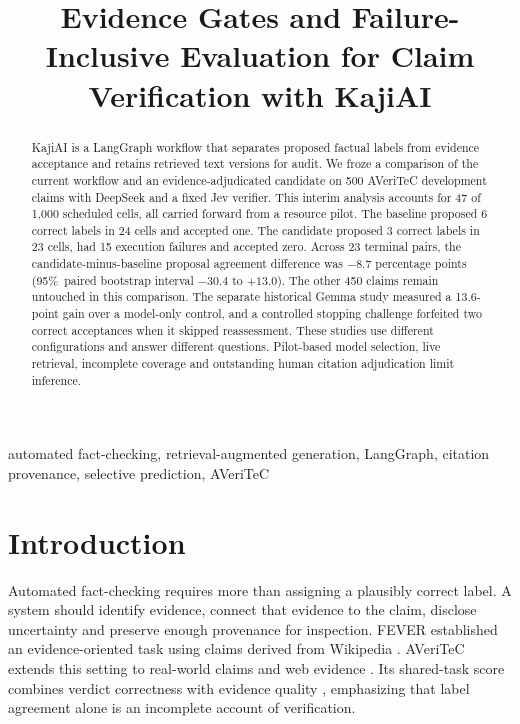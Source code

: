 \documentclass[conference]{IEEEtran}
\newcommand{\pct}{\%}
\begin{document}
\title{Evidence Gates and Failure-Inclusive Evaluation for Claim Verification with KajiAI}

\author{}
\maketitle

\begin{abstract}
KajiAI is a LangGraph workflow that separates proposed factual labels from evidence acceptance and retains retrieved text versions for audit. We froze a comparison of the current workflow and an evidence-adjudicated candidate on 500 AVeriTeC development claims with DeepSeek and a fixed Jev verifier. This interim analysis accounts for 47 of 1,000 scheduled cells, all carried forward from a resource pilot. The baseline proposed 6 correct labels in 24 cells and accepted one. The candidate proposed 3 correct labels in 23 cells, had 15 execution failures and accepted zero. Across 23 terminal pairs, the candidate-minus-baseline proposal agreement difference was $-8.7$ percentage points (95\pct\ paired bootstrap interval $-30.4$ to $+13.0$). The other 450 claims remain untouched in this comparison. The separate historical Gemma study measured a 13.6-point gain over a model-only control, and a controlled stopping challenge forfeited two correct acceptances when it skipped reassessment. These studies use different configurations and answer different questions. Pilot-based model selection, live retrieval, incomplete coverage and outstanding human citation adjudication limit inference.
\end{abstract}

\begin{IEEEkeywords}
automated fact-checking, retrieval-augmented generation, LangGraph, citation provenance, selective prediction, AVeriTeC
\end{IEEEkeywords}

\section{Introduction}
Automated fact-checking requires more than assigning a plausibly correct label. A system should identify evidence, connect that evidence to the claim, disclose uncertainty and preserve enough provenance for inspection. FEVER established an evidence-oriented task using claims derived from Wikipedia \cite{fever}. AVeriTeC extends this setting to real-world claims and web evidence \cite{averitec}. Its shared-task score combines verdict correctness with evidence quality \cite{sharedtask}, emphasizing that label agreement alone is an incomplete account of verification.
\end{document}
